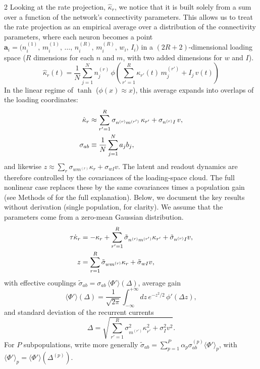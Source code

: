 \documentclass[10pt]{article}
\begin{document}
\begin{multicols}{2}
Looking at the rate projection, $\hat{\kappa}_r$, we notice that it is built solely from a sum over a function of the network's connectivity parameters. This allows us to treat the rate projection as an empirical average over a distribution of the connectivity parameters, where each neuron becomes a point $\mathbf{a}_i=\bigl(n_i^{(1)},\,m_i^{(1)},\,\ldots,\,n_i^{(R)},\,m_i^{(R)},\,w_i,\,I_i\bigr)$ in a $(2R + 2)$-dimensional loading space ($R$ dimensions for each $n$ and $m$, with two added dimensions for $w$ and $I$).
\begin{equation}
\hat{\kappa}_r(t)
=\frac{1}{N}\sum_{j=1}^{N} n^{(r)}_j\,
\phi\!\left(\sum_{r'=1}^{R}\kappa_{r'}(t)\,m^{(r')}_j
+I_j\,v(t)\right)
\end{equation}
In the linear regime of $\tanh$ ($\phi(x)\approx x$), this average expands into overlaps of the loading coordinates:
\begin{align}
\hat{\kappa}_r
&\approx\sum_{r'=1}^{R}
\sigma_{n^{(r)}m^{(r')}}\,\kappa_{r'}
+\sigma_{n^{(r)}I}\,v, \notag\\
\sigma_{ab}&\equiv\frac{1}{N}\sum_{j=1}^{N}a_j b_j,
\end{align}
and likewise $z\approx\sum_{r}\sigma_{wm^{(r)}}\kappa_r+\sigma_{wI}v$. The latent and readout dynamics are therefore controlled by the covariances of the loading-space cloud. The full nonlinear case replaces these by the same covariances times a population gain (see Methods of \citet{dubreuil2022} for the full explanation). Below, we document the key results without derivation (single population, for clarity). We assume that the parameters come from a zero-mean Gaussian distribution.
\begin{align}
\tau\dot{\kappa}_r
&=-\kappa_r
+\sum_{r'=1}^{R}
\tilde{\sigma}_{n^{(r)}m^{(r')}}\kappa_{r'}
+\tilde{\sigma}_{n^{(r)}I}v, \notag\\
z
&=\sum_{r=1}^{R}\tilde{\sigma}_{wm^{(r)}}\kappa_r
+\tilde{\sigma}_{wI}v,
\end{align}
with effective couplings $\tilde{\sigma}_{ab}=\sigma_{ab}\,\langle\Phi'\rangle(\Delta)$, average gain
\begin{equation}
\langle\Phi'\rangle(\Delta)
=\frac{1}{\sqrt{2\pi}}
\int_{-\infty}^{+\infty}
dz\,e^{-z^{2}/2}\,\phi'(\Delta z),
\end{equation}
and standard deviation of the recurrent currents
\begin{equation}
\Delta
=\sqrt{
\sum_{r'=1}^{R}\sigma_{m^{(r')}}^{2}\kappa_{r'}^{2}
+\sigma_I^{2}v^{2}
}.
\end{equation}
For $P$ subpopulations, \citet{dubreuil2022} write more generally $\tilde{\sigma}_{ab}=\sum_{p=1}^{P}\alpha_p\sigma_{ab}^{(p)}\langle\Phi'\rangle_p$, with $\langle\Phi'\rangle_p=\langle\Phi'\rangle(\Delta^{(p)})$.


\end{multicols}
\end{document}
